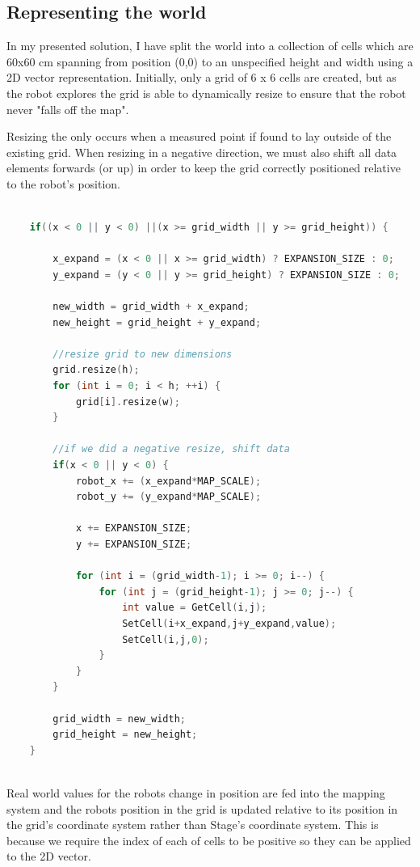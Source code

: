 \documentclass{article}
\begin{document}
\subsection{Representing the world}
In my presented solution, I have split the world into a collection of cells which are 60x60 cm spanning from position (0,0) to an unspecified height and width using a 2D vector representation. Initially, only a grid of 6 x 6 cells are created, but as the robot explores the grid is able to dynamically resize to ensure that the robot never "falls off the map". 

Resizing the only occurs when a measured point if found to lay outside of the existing grid. When resizing in a negative direction, we must also shift all data elements forwards (or up) in order to keep the grid correctly positioned relative to the robot's position.

\begin{center}
	\begin{lstlisting}[language=c++, showstringspaces=false, caption={C++ code for dynamically resizing the grid when a point (x,y) falls outside the current grid's size}]

	if((x < 0 || y < 0) ||(x >= grid_width || y >= grid_height)) {
		
		x_expand = (x < 0 || x >= grid_width) ? EXPANSION_SIZE : 0;
		y_expand = (y < 0 || y >= grid_height) ? EXPANSION_SIZE : 0;

		new_width = grid_width + x_expand;
		new_height = grid_height + y_expand;

		//resize grid to new dimensions
		grid.resize(h);
		for (int i = 0; i < h; ++i) {
 			grid[i].resize(w);
 		}
		
		//if we did a negative resize, shift data
		if(x < 0 || y < 0) {
			robot_x += (x_expand*MAP_SCALE);
			robot_y += (y_expand*MAP_SCALE);

			x += EXPANSION_SIZE;
			y += EXPANSION_SIZE;

			for (int i = (grid_width-1); i >= 0; i--) {
				for (int j = (grid_height-1); j >= 0; j--) {
					int value = GetCell(i,j);
					SetCell(i+x_expand,j+y_expand,value);
					SetCell(i,j,0);
				}
			}
		}

		grid_width = new_width;
		grid_height = new_height;
	}
		
	\end{lstlisting}
\end{center}

Real world values for the robots change in position are fed into the mapping system and the robots position in the grid is updated relative to its position in the grid's coordinate system rather than Stage's coordinate system. This is because we require the index of each of cells to be positive so they can be applied to the 2D vector.
\end{document}
